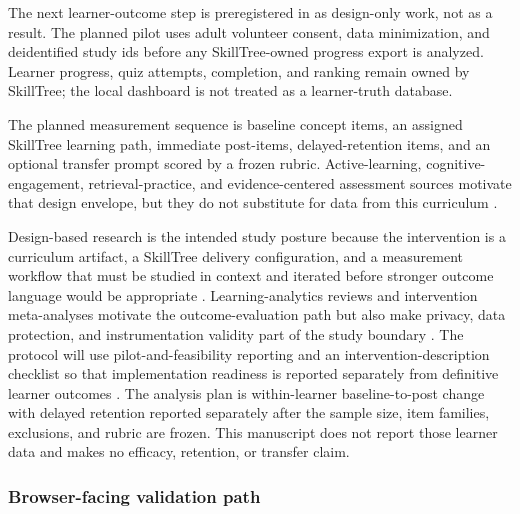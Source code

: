 \documentclass[
  english,
]{article}
\begin{document}
The next learner-outcome step is preregistered in
 as design-only work, not as a result. The
planned pilot uses adult volunteer consent, data minimization, and
deidentified study ids before any SkillTree-owned progress export is
analyzed. Learner progress, quiz attempts, completion, and ranking
remain owned by SkillTree; the local dashboard is not treated as a
learner-truth database.

The planned measurement sequence is baseline concept items, an assigned
SkillTree learning path, immediate post-items, delayed-retention items,
and an optional transfer prompt scored by a frozen rubric.
Active-learning, cognitive-engagement, retrieval-practice, and
evidence-centered assessment sources motivate that design envelope, but
they do not substitute for data from this curriculum
\citep{freeman2014activelearning, chi2014icap, roediger2006testenhanced, mislevy2003ecd, black1998assessment, shute2008formative_feedback, monib2024microlearning_boundaries, rof2024microlearning_satisfaction, emin2026epistemic_curiosity_mind_wandering}.

Design-based research is the intended study posture because the
intervention is a curriculum artifact, a SkillTree delivery
configuration, and a measurement workflow that must be studied in
context and iterated before stronger outcome language would be
appropriate
\citep{designbasedresearchcollective2003, barab2004design_based}.
Learning-analytics reviews and intervention meta-analyses motivate the
outcome-evaluation path but also make privacy, data protection, and
instrumentation validity part of the study boundary
\citep{liu2025learning_analytics_intervention_meta, hernandezcampos2025_learning_analytics_outcomes, liu2023_learning_analytics_privacy, sclater2015learning_analytics_code}.
The protocol will use pilot-and-feasibility reporting and an
intervention-description checklist so that implementation readiness is
reported separately from definitive learner outcomes
\citep{eldridge2016consort_pilot, hoffmann2014tidier}. The analysis plan
is within-learner baseline-to-post change with delayed retention
reported separately after the sample size, item families, exclusions,
and rubric are frozen. This manuscript does not report those learner
data and makes no efficacy, retention, or transfer claim.

\subsubsection{Browser-facing validation
path}\label{browser-facing-validation-path}
\end{document}
